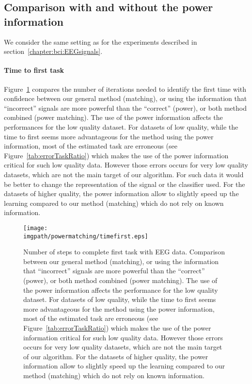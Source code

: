 \subsection{Comparison with and without the power information}

We consider the same setting as for the experiments described in section~\ref{chapter:bci:EEGsignals}. 

\paragraph{Time to first task} Figure~\ref{fig:timefirst_powermatching} compares the number of iterations needed to identify the first time with confidence between our general method (matching), or using the information that ``incorrect'' signals are more powerful than the ``correct'' (power), or both method combined (power matching). The use of the power information affects the performances for the low quality dataset. For datasets of low quality, while the time to first seems more advantageous for the method using the power information, most of the estimated task are erroneous (see Figure~\ref{tab:errorTaskRatio}) which makes the use of the power information critical for such low quality data. However those errors occurs for very low quality datasets, which are not the main target of our algorithm. For such data it would be better to change the representation of the signal or the classifier used. For the datasets of higher quality, the power information allow to slightly speed up the learning compared to our method (matching) which do not rely on known information. 

\begin{figure}[!htbp]
\centering
\texttt{[image: \\imgpath/powermatching/timefirst.eps]}
\caption{Number of steps to complete first task with EEG data. Comparison between our general method (matching), or using the information that ``incorrect'' signals are more powerful than the ``correct'' (power), or both method combined (power matching). The use of the power information affects the performance for the low quality dataset. For datasets of low quality, while the time to first seems more advantageous for the method using the power information, most of the estimated task are erroneous (see Figure~\ref{tab:errorTaskRatio}) which makes the use of the power information critical for such low quality data. However those errors occurs for very low quality datasets, which are not the main target of our algorithm. For the datasets of higher quality, the power information allow to slightly speed up the learning compared to our method (matching) which do not rely on known information.}
\label{fig:timefirst_powermatching}
\end{figure} 

